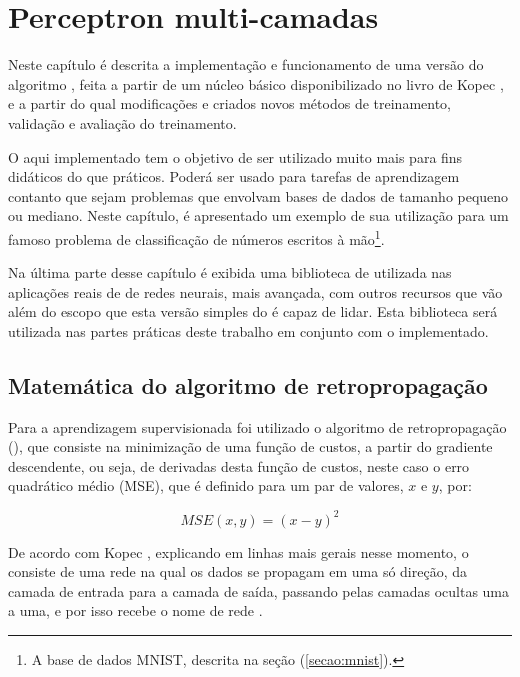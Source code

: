 
\chapter{Perceptron multi-camadas}
\label{cap:perceptron}

Neste capítulo é descrita a implementação e funcionamento de uma versão do algoritmo , feita a partir de um núcleo básico disponibilizado no livro de Kopec \citep{classic}, e a partir do qual modificações e criados novos métodos de treinamento, validação e avaliação do treinamento.

O  aqui implementado tem o objetivo de ser utilizado muito mais para fins didáticos do que práticos. Poderá ser usado para tarefas de aprendizagem contanto que sejam problemas que envolvam bases de dados de tamanho pequeno ou mediano. Neste capítulo, é apresentado um exemplo de sua utilização para um famoso problema de classificação de números escritos à mão\footnote{A base de dados MNIST, descrita na seção (\ref{secao:mnist}).}.

Na última parte desse capítulo é exibida uma biblioteca de  utilizada nas aplicações reais de  de redes neurais, mais avançada, com outros recursos que vão além do escopo que esta versão simples do  é capaz de lidar. Esta biblioteca será utilizada nas partes práticas deste trabalho em conjunto com o  implementado.

\section{Matemática do algoritmo de retropropagação}

Para a aprendizagem supervisionada foi utilizado o algoritmo de retropropagação (), que consiste na minimização de uma função de custos, a partir do gradiente descendente, ou seja, de derivadas desta função de custos, neste caso o erro quadrático médio (MSE), que é definido para um par de valores, $x$ e $y$, por:

\[
MSE(x, y) = (x - y)^2
\]

De acordo com Kopec \citep{classic}, explicando em linhas mais gerais nesse momento, o  consiste de uma rede na qual os dados se propagam em uma só direção, da camada de entrada para a camada de saída, passando pelas camadas ocultas uma a uma, e por isso recebe o nome de rede . 

